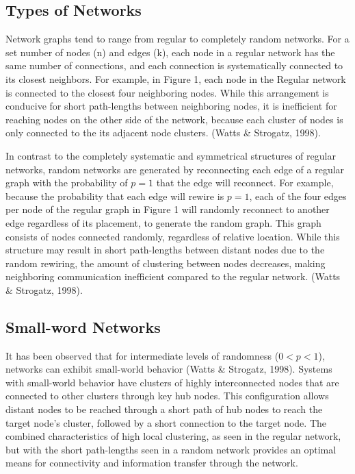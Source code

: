 \documentclass[11pt,letterpaper,doublespacing,titlepage]{article}
\begin{document}
\subsection{Types of Networks}
\par
Network graphs tend to range from regular to completely random networks. For a set number of nodes (n) and edges (k), each node in a regular network has the same number of connections, and each connection is systematically connected to its closest neighbors. For example, in Figure 1, each node in the Regular network is connected to the closest four neighboring nodes. While this arrangement is conducive for short path-lengths between neighboring nodes, it is inefficient for reaching nodes on the other side of the network, because each cluster of nodes is only connected to the its adjacent node clusters. (Watts \& Strogatz, 1998).
\par
In contrast to the completely systematic and symmetrical structures of regular networks, random networks are generated by reconnecting each edge of a regular graph with the probability of $p=1$ that the edge will reconnect. For example, because the probability that each edge will rewire is $p=1$, each of the four edges per node of the regular graph in Figure 1 will randomly reconnect to another edge regardless of its placement, to generate the random graph. This graph consists of nodes connected randomly, regardless of relative location. While this structure may result in short path-lengths between distant nodes due to the random rewiring, the amount of clustering between nodes decreases, making neighboring communication inefficient compared to the regular network.  (Watts \& Strogatz, 1998).


\subsection{Small-word Networks}
\par
It has been observed that for intermediate levels of randomness ($ 0 < p < 1 $),  networks can exhibit small-world behavior (Watts \& Strogatz, 1998). Systems with small-world behavior have clusters of highly interconnected nodes that are connected to other clusters through key hub nodes. This configuration allows distant nodes to be reached through a short path of hub nodes to reach the target node’s cluster, followed by a short connection to the target node. The combined characteristics of  high local clustering, as seen in the regular network, but with the short path-lengths seen in a random network provides an optimal means for connectivity and information transfer through the network. 
\end{document}
